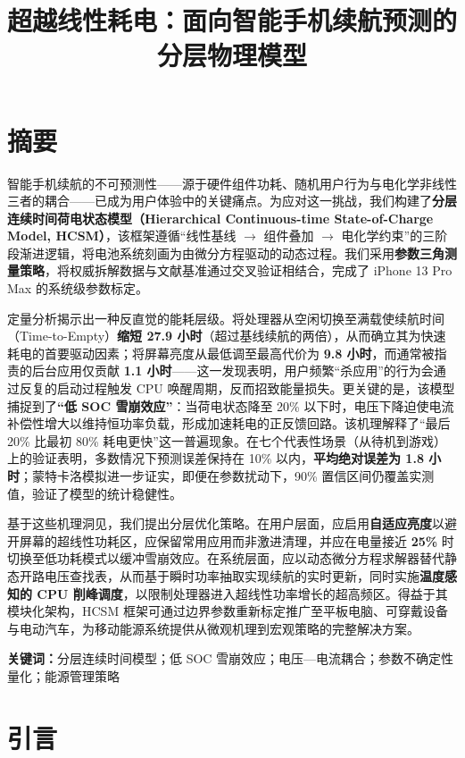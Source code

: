 \documentclass[11pt,a4paper]{ctexart}
\title{超越线性耗电：面向智能手机续航预测的分层物理模型}
\author{}
\date{}
\begin{document}
\maketitle

\section*{摘要}

智能手机续航的不可预测性——源于硬件组件功耗、随机用户行为与电化学非线性三者的耦合——已成为用户体验中的关键痛点。为应对这一挑战，我们构建了\textbf{分层连续时间荷电状态模型（Hierarchical Continuous-time State-of-Charge Model, HCSM）}，该框架遵循“线性基线 $\rightarrow$ 组件叠加 $\rightarrow$ 电化学约束”的三阶段渐进逻辑，将电池系统刻画为由微分方程驱动的动态过程。我们采用\textbf{参数三角测量策略}，将权威拆解数据与文献基准通过交叉验证相结合，完成了 iPhone 13 Pro Max 的系统级参数标定。

定量分析揭示出一种反直觉的能耗层级。将处理器从空闲切换至满载使续航时间（Time-to-Empty）\textbf{缩短 27.9 小时}（超过基线续航的两倍），从而确立其为快速耗电的首要驱动因素；将屏幕亮度从最低调至最高代价为 \textbf{9.8 小时}，而通常被指责的后台应用仅贡献 \textbf{1.1 小时}——这一发现表明，用户频繁“杀应用”的行为会通过反复的启动过程触发 CPU 唤醒周期，反而招致能量损失。更关键的是，该模型捕捉到了\textbf{“低 SOC 雪崩效应”}：当荷电状态降至 20\% 以下时，电压下降迫使电流补偿性增大以维持恒功率负载，形成加速耗电的正反馈回路。该机理解释了“最后 20\% 比最初 80\% 耗电更快”这一普遍现象。在七个代表性场景（从待机到游戏）上的验证表明，多数情况下预测误差保持在 10\% 以内，\textbf{平均绝对误差为 1.8 小时}；蒙特卡洛模拟进一步证实，即便在参数扰动下，90\% 置信区间仍覆盖实测值，验证了模型的统计稳健性。

基于这些机理洞见，我们提出分层优化策略。在用户层面，应启用\textbf{自适应亮度}以避开屏幕的超线性功耗区，应保留常用应用而非激进清理，并应在电量接近 \textbf{25\%} 时切换至低功耗模式以缓冲雪崩效应。在系统层面，应以动态微分方程求解器替代静态开路电压查找表，从而基于瞬时功率抽取实现续航的实时更新，同时实施\textbf{温度感知的 CPU 削峰调度}，以限制处理器进入超线性功率增长的超高频区。得益于其模块化架构，HCSM 框架可通过边界参数重新标定推广至平板电脑、可穿戴设备与电动汽车，为移动能源系统提供从微观机理到宏观策略的完整解决方案。

\noindent\textbf{关键词：}分层连续时间模型；低 SOC 雪崩效应；电压—电流耦合；参数不确定性量化；能源管理策略

\newpage
\section{引言}
\end{document}
